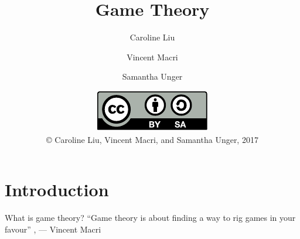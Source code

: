 

\title{Game Theory}
\author{Caroline Liu \and Vincent Macri \and Samantha Unger}
\date{\includegraphics{../LicenseLogo}\\\copyright{} Caroline Liu, Vincent Macri, and Samantha Unger, 2017}


	\frame{\titlepage}
	\section{Introduction}
	\begin{namedframe}{What is game theory?}
		``Game theory is about finding a way to rig games in your favour''
		\sep
		\flushright
		--- Vincent Macri
	\end{namedframe}
	

